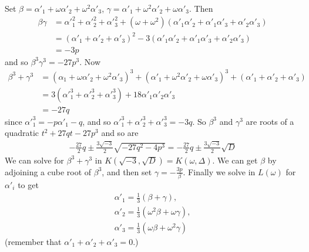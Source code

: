 \documentclass[a4paper]{article}
\begin{document}
Set $\beta = \alpha'_1+\omega\alpha'_2+\omega^2\alpha'_3$, $\gamma = \alpha'_1+\omega^2\alpha'_2+\omega\alpha'_3$. Then 
\begin{equation*}
\begin{aligned}
\beta\gamma &= {\alpha'}_1^2+{\alpha'}_2^2+{\alpha'}_3^2 + (\omega+\omega^2)(\alpha'_1\alpha'_2+\alpha'_1\alpha'_3+\alpha'_2\alpha'_3)\\
&= (\alpha'_1+\alpha'_2+\alpha'_3)^2-3(\alpha'_1\alpha'_2+\alpha'_1\alpha'_3+\alpha'_2\alpha'_3)\\
&= -3p
\end{aligned}
\end{equation*}
and so $\beta^3\gamma^3 = -27p^3$. Now
\begin{equation*}
\begin{aligned}
\beta^3+\gamma^3 &=(\alpha_1+\omega\alpha'_2+\omega^2\alpha'_3)^3 + (\alpha'_1+\omega^2\alpha'_2+\omega\alpha'_3)^3 + (\alpha'_1+\alpha'_2+\alpha'_3)\\
&=3({\alpha'}_1^3+{\alpha'}_2^3+{\alpha'}_3^3) + 18\alpha'_1\alpha'_2\alpha'_3\\
&= -27q
\end{aligned}
\end{equation*}
since ${\alpha'}_1^3 = -p\alpha'_1-q$, and so ${\alpha'}_1^3+{\alpha'}_2^3+{\alpha'}_3^3 = -3q$. So $\beta^3$ and $\gamma^3$ are roots of a quadratic $t^2+27qt-27p^3$ and so are 
\begin{equation*}
\begin{aligned}
-\frac{27}{2}q \pm \frac{3\sqrt{-3}}{2} \sqrt{-27q^2-4p^3} = -\frac{27}{2}q \pm \frac{3\sqrt{-3}}{2} \sqrt{D}
\end{aligned}
\end{equation*}
We can solve for $\beta^3+\gamma^3$ in $K(\sqrt{-3},\sqrt{D}) = K(\omega,\Delta)$. We can get $\beta$ by adjoining a cube root of $\beta^3$, and then set $\gamma = -\frac{3p}{\beta}$. Finally we solve in $L(\omega)$ for $\alpha'_i$ to get
\begin{equation*}
\begin{aligned}
\alpha'_1 = \frac{1}{3}(\beta+\gamma),\\
\alpha'_2 = \frac{1}{3}(\omega^2\beta+\omega\gamma),\\
\alpha'_3 = \frac{1}{3}(\omega\beta+\omega^2\gamma)
\end{aligned}
\end{equation*}
(remember that $\alpha'_1+\alpha'_2+\alpha'_3 = 0$.)
\end{document}
